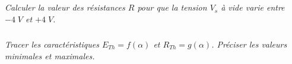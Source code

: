 \documentclass[10pt]{article}
\newif\ifprof
\begin{document}
\subparagraph{}
\textit{Calculer la valeur des résistances $R$ pour que la tension $V_s$ à vide varie entre $-4\; V$ et $+4\; V$.}
\ifprof
\begin{corrige}
Lorsque le montage est à vide, le courant ne circule pas. L'intensité est donc nulle. En conséquence : 
$$
V_S = E_{Th}
$$

Pour $\alpha=-\pi$, on veut donc $V_S = -4$, en conséquence :
$$
E_{Th}\left( -\pi \right)  = -4 
\Longleftrightarrow
 \dfrac{-6\pi R_0}{\pi \left(2R + R_0 \right)} = -4
\Longleftrightarrow
-6\pi R_0  = -4 \pi \left(2R + R_0 \right)
\Longleftrightarrow
R = \dfrac{R_0}{4}
$$

De même, pour $\alpha=\pi$, on veut donc $V_S = 4$, en conséquence :
$$
E_{Th}\left( \pi \right)  = 4 
\Longleftrightarrow
 \dfrac{6\pi R_0}{\pi \left(2R + R_0 \right)} = 4
\Longleftrightarrow
6\pi R_0  = 4 \pi \left(2R + R_0 \right)
\Longleftrightarrow
R = \dfrac{R_0}{4}
$$


\end{corrige}
\else
\fi

\subparagraph{}
\textit{Tracer les caractéristiques $E_{Th} = f(\alpha)$ et $R_{Th}=g(\alpha)$. Préciser les valeurs minimales et maximales.}
\ifprof
\begin{corrige}
On a donc  $E_{Th} (\alpha) = \dfrac{4\alpha}{ \pi}$ et $R_{Th} (\alpha) =\dfrac{\dfrac{R_0^2}{16} +\dfrac{R_0^2}{4}+   \dfrac{R_0^2}{4} \left( 1 - \dfrac{\alpha^2}{\pi^2}  \right) }{\dfrac{3 R_0}{2} }  =\dfrac{\dfrac{R_0}{8} +\dfrac{R_0}{2}+   \dfrac{R_0}{2} \left( 1 - \dfrac{\alpha^2}{\pi^2}  \right) }{3 }=R_0 \dfrac{9  - \dfrac{4\alpha^2}{\pi^2}   }{12}$.
\end{corrige}
\else
\fi
\end{document}
